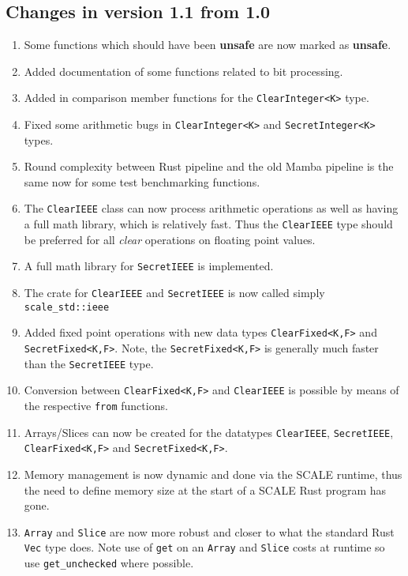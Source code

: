 \subsection{Changes in version 1.1 from 1.0}
\begin{enumerate}
\item Some functions which should have been {\bf unsafe} are now marked as {\bf unsafe}.
\item Added documentation of some functions related to bit processing.
\item Added in comparison member functions for the \verb|ClearInteger<K>| type.
\item Fixed some arithmetic bugs in \verb|ClearInteger<K>| and \verb|SecretInteger<K>| types.
\item Round complexity between Rust pipeline and the old Mamba pipeline is the same now for some test benchmarking functions.
\item The \verb|ClearIEEE| class can now process arithmetic operations
	as well as having a full math library, which is relatively fast.
	Thus the \verb|ClearIEEE| type should be preferred for all
	{\em clear} operations on floating point values.
\item A full math library for \verb|SecretIEEE| is implemented.
\item The crate for \verb|ClearIEEE| and \verb|SecretIEEE| is now
	called simply \verb|scale_std::ieee|
\item Added fixed point operations with new data types
\verb|ClearFixed<K,F>| and \verb|SecretFixed<K,F>|.
Note, the \verb|SecretFixed<K,F>| is generally much faster than 
the \verb|SecretIEEE| type.
\item Conversion between \verb|ClearFixed<K,F>| and \verb|ClearIEEE|
	is possible by means of the respective \verb|from| functions.
\item Arrays/Slices can now be created for the datatypes
	\verb|ClearIEEE|,  \verb|SecretIEEE|, \verb|ClearFixed<K,F>| and \verb|SecretFixed<K,F>|.
\item Memory management is now dynamic and done via the SCALE runtime, thus the need to define memory size at the start of a SCALE Rust program has gone.
\item \verb|Array| and \verb|Slice| are now more robust and closer to what the standard
        Rust \verb|Vec| type does.
	Note use of \verb|get| on an \verb|Array| and \verb|Slice| costs at runtime
	so use  \verb|get_unchecked| where possible.
\end{enumerate}
